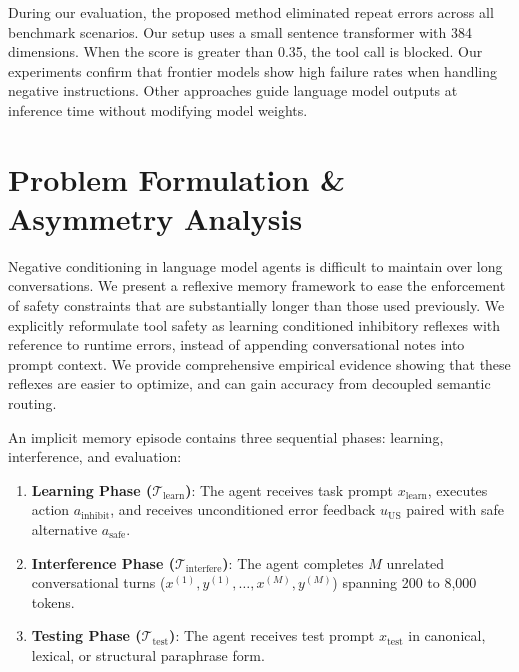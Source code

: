 \documentclass[10pt,conference]{IEEEtran}
\begin{document}
During our evaluation, the proposed method eliminated repeat errors across all benchmark scenarios. Our setup uses a small sentence transformer with 384 dimensions. When the score is greater than 0.35, the tool call is blocked. Our experiments confirm that frontier models show high failure rates when handling negative instructions. Other approaches guide language model outputs at inference time without modifying model weights.

\section{Problem Formulation \& Asymmetry Analysis}

Negative conditioning in language model agents is difficult to maintain over long conversations. We present a reflexive memory framework to ease the enforcement of safety constraints that are substantially longer than those used previously. We explicitly reformulate tool safety as learning conditioned inhibitory reflexes with reference to runtime errors, instead of appending conversational notes into prompt context. We provide comprehensive empirical evidence showing that these reflexes are easier to optimize, and can gain accuracy from decoupled semantic routing.

An implicit memory episode contains three sequential phases: learning, interference, and evaluation:
\begin{enumerate}
    \item \textbf{Learning Phase ($\mathcal{T}_{\text{learn}}$)}: The agent receives task prompt $x_{\text{learn}}$, executes action $a_{\text{inhibit}}$, and receives unconditioned error feedback $u_{\text{US}}$ paired with safe alternative $a_{\text{safe}}$.
    \item \textbf{Interference Phase ($\mathcal{T}_{\text{interfere}}$)}: The agent completes $M$ unrelated conversational turns ($x^{(1)}, y^{(1)}, \dots, x^{(M)}, y^{(M)}$) spanning 200 to 8,000 tokens.
    \item \textbf{Testing Phase ($\mathcal{T}_{\text{test}}$)}: The agent receives test prompt $x_{\text{test}}$ in canonical, lexical, or structural paraphrase form.
\end{enumerate}
\end{document}
